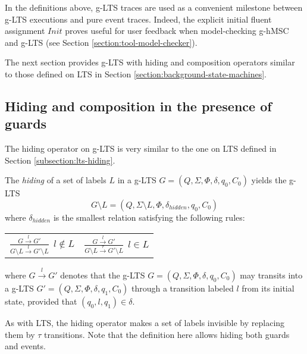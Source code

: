 In the definitions above, g-LTS traces are used as a convenient milestone between g-LTS executions and pure event traces. Indeed, the explicit initial fluent assignment $Init$ proves useful for user feedback when model-checking g-hMSC and g-LTS (see Section \ref{section:tool-model-checker}). 

The next section provides g-LTS with hiding and composition operators similar to those defined on LTS in Section \ref{section:background-state-machines}.

\subsection{Hiding and composition in the presence of guards\label{subsection:glts-operators}}

The hiding operator on g-LTS is very similar to the one on LTS defined in Section \ref{subsection:lts-hiding}. 

\begin{definition}
The \emph{hiding} of a set of labels $L$ in a g-LTS $G = (Q,\Sigma,\Phi,\delta,q_{0},C_{0})$ yields the g-LTS
\begin{equation*}
G \setminus L = (Q,\Sigma \setminus L,\Phi,\delta_{hidden},q_{0},C_0)
\end{equation*}
\noindent where $\delta_{hidden}$ is the smallest relation satisfying the following rules:
\begin{center}
\begin{tabular}{cc}
$\frac{\displaystyle G \stackrel{l}{\longrightarrow} G'}{\displaystyle G \setminus L \stackrel{l}{\longrightarrow} G' \setminus L}~~l \notin L$ & 
$\frac{\displaystyle G \stackrel{l}{\longrightarrow} G'}{\displaystyle G \setminus L \stackrel{\tau}{\longrightarrow} G' \setminus L}~~l \in L$ \\
\end{tabular}
\end{center}
where $G \stackrel{l}{\longrightarrow} G'$ denotes that the g-LTS $G = (Q,\Sigma,\Phi,\delta,q_{0},C_{0})$ may transits into a g-LTS $G' = (Q,\Sigma,\Phi,\delta,q_{1},C_{0})$ through a transition labeled $l$ from its initial state, provided that $(q_0,l,q_1) \in \delta$. 
\label{definition:glts-hiding}
\end{definition}

As with LTS, the hiding operator makes a set of labels invisible by replacing them by $\tau$ transitions. Note that the definition here allows hiding both guards and events. 

